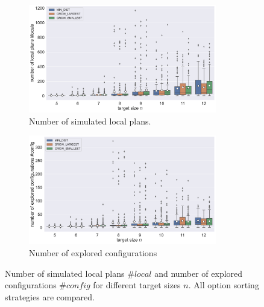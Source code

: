 \begin{figure}
	\centering
	\begin{subfigure}[b]{\textwidth}
		\centering
		\includegraphics[width=0.9\textwidth]{figures/plots/AFN_nlocal.pdf}
		\caption{Number of simulated local plans.}
		\label{fig:AFN_nlocal}
	\end{subfigure}
	
	\begin{subfigure}[b]{\textwidth}
		\centering
		\includegraphics[width=0.9\textwidth]{figures/plots/AFN_nconfig.pdf}
		\caption{Number of explored configurations}
		\label{fig:AFN_nconfig}
	\end{subfigure}
	\caption[$\#\textit{config}$ and $\#\textit{config}$ for different target sizes]{Number of simulated local plans $\#\textit{local}$ and number of explored configurations $\#\textit{config}$ for different target sizes $n$. All option sorting strategies are compared.}
	\label{fig:AFN_planstats}
\end{figure}

